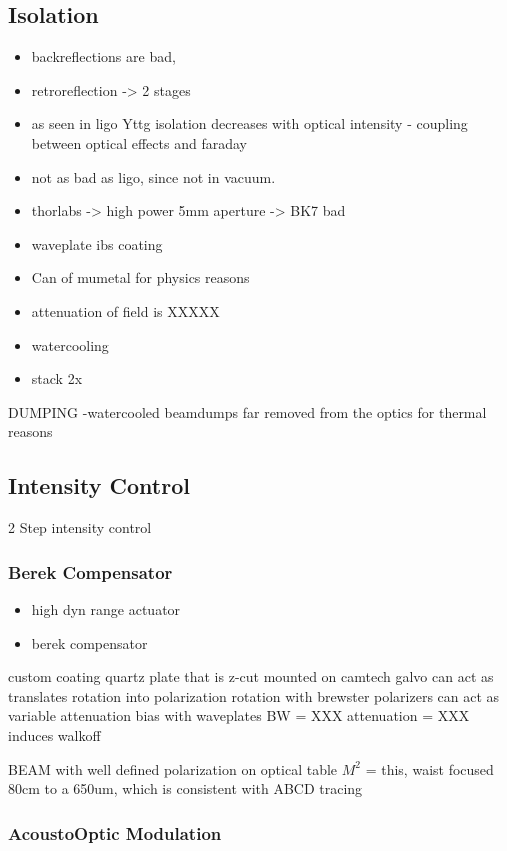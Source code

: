\documentclass[twocolumn,aps,pra,showpacs,preprintnumbers,bibnotes]{revtex4-1}
\begin{document}
\subsection{Isolation}
\begin{itemize}
\item backreflections are bad,
\item retroreflection -> 2 stages
\item as seen in ligo Yttg isolation decreases with optical intensity - coupling between optical effects and faraday
\item not as bad as ligo, since not in vacuum.
\item thorlabs -> high power 5mm aperture -> BK7 bad
\item waveplate ibs coating
\item Can of mumetal for physics reasons
\item attenuation of field is XXXXX
\item watercooling
\item stack 2x
\end{itemize}

DUMPING
-watercooled beamdumps far removed from the optics for thermal reasons
\subsection{Intensity Control}
2 Step intensity control

\subsubsection{Berek Compensator}
\begin{itemize}
\item high dyn range actuator
\item berek compensator
\end{itemize}

custom coating quartz plate that is z-cut mounted on camtech galvo
can act as translates rotation into polarization rotation
with brewster polarizers can act as variable attenuation
bias with waveplates
BW = XXX
attenuation = XXX
induces walkoff

BEAM with well defined polarization on optical table 
$M^2$ = this, waist focused 80cm to a 650um, which is consistent with ABCD tracing

\subsubsection{AcoustoOptic Modulation}
\end{document}
